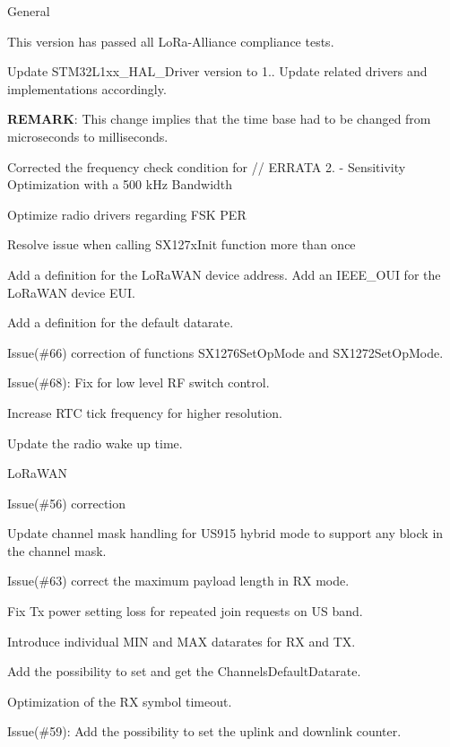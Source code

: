 \begin{DoxyItemize}
\item General
\begin{DoxyEnumerate}
\item This version has passed all Lo\+Ra-\/\+Alliance compliance tests.
\item Update S\+T\+M32\+L1xx\+\_\+\+H\+A\+L\+\_\+\+Driver version to 1.. Update related drivers and implementations accordingly.

{\bfseries R\+E\+M\+A\+RK}\+: This change implies that the time base had to be changed from microseconds to milliseconds.
\item Corrected the frequency check condition for // E\+R\+R\+A\+TA 2. -\/ Sensitivity Optimization with a 500 k\+Hz Bandwidth
\item Optimize radio drivers regarding F\+SK P\+ER
\item Resolve issue when calling S\+X127x\+Init function more than once
\item Add a definition for the Lo\+Ra\+W\+AN device address. Add an I\+E\+E\+E\+\_\+\+O\+UI for the Lo\+Ra\+W\+AN device E\+UI.
\item Add a definition for the default datarate.
\item Issue(\#66) correction of functions S\+X1276\+Set\+Op\+Mode and S\+X1272\+Set\+Op\+Mode.
\item Issue(\#68)\+: Fix for low level RF switch control.
\item Increase R\+TC tick frequency for higher resolution.
\item Update the radio wake up time.
\end{DoxyEnumerate}
\item Lo\+Ra\+W\+AN
\begin{DoxyEnumerate}
\item Issue(\#56) correction
\item Update channel mask handling for U\+S915 hybrid mode to support any block in the channel mask.
\item Issue(\#63) correct the maximum payload length in RX mode.
\item Fix Tx power setting loss for repeated join requests on US band.
\item Introduce individual M\+IN and M\+AX datarates for RX and TX.
\item Add the possibility to set and get the Channels\+Default\+Datarate.
\item Optimization of the RX symbol timeout.
\item Issue(\#59)\+: Add the possibility to set the uplink and downlink counter.

\end{DoxyEnumerate}
\end{DoxyItemize}
